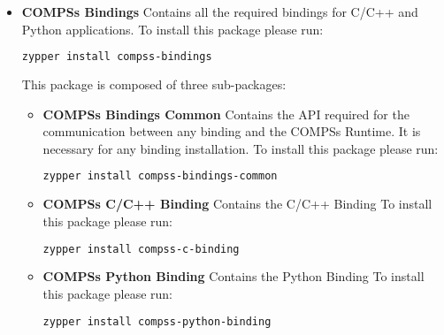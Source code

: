 \begin{itemize}
 \item \textbf{COMPSs Bindings} \newline
       Contains all the required bindings for C/C++ and Python applications.
       \newline
       To install this package please run:
       \begin{lstlisting}[language=bash]
	  zypper install compss-bindings
       \end{lstlisting}
       This package is composed of three sub-packages:
       \begin{itemize}
        \item \textbf{COMPSs Bindings Common} \newline
		  Contains the API required for the communication between any binding and the COMPSs Runtime. It is necessary for any binding installation.
	      \newline
	      To install this package please run:
	      \begin{lstlisting}[language=bash]
		  zypper install compss-bindings-common
	      \end{lstlisting}
        \item \textbf{COMPSs C/C++ Binding} \newline
	      Contains the C/C++ Binding
	      \newline
	      To install this package please run:
	      \begin{lstlisting}[language=bash]
		  zypper install compss-c-binding
	      \end{lstlisting}
        \item \textbf{COMPSs Python Binding} \newline
	      Contains the Python Binding
	      \newline
	      To install this package please run:
	      \begin{lstlisting}[language=bash]
		  zypper install compss-python-binding
	      \end{lstlisting}
       \end{itemize}


\end{itemize}
